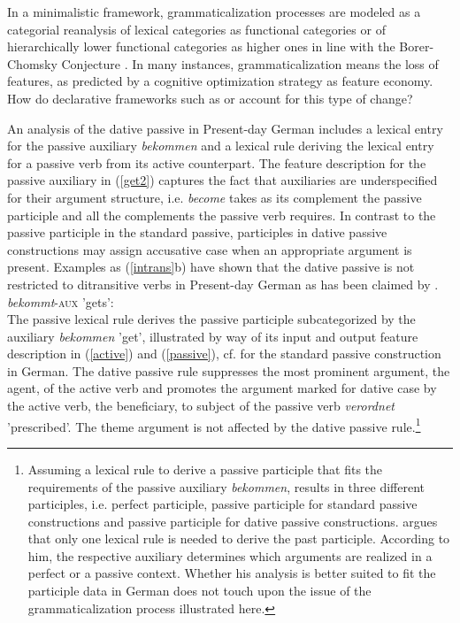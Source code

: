 \documentclass[output=paper]{langsci/langscibook}
\begin{document}
In a minimalistic framework, grammaticalization processes are modeled as a categorial reanalysis of lexical categories as functional categories or of hierarchically lower functional categories as higher ones in line with the Borer-Chomsky Conjecture \citep{RobRou2003}. In many instances, grammaticalization means the loss of features, as predicted by a cognitive optimization strategy as feature economy. How do declarative frameworks such as \lfg or \hpsg account for this type of change? 

An \hpsg analysis of the dative passive in Present-day German includes a lexical entry for the passive auxiliary \textit{bekommen} and a lexical rule deriving the lexical entry for a passive verb from its active counterpart. The feature description for the passive auxiliary in (\ref{get2}) captures the fact that auxiliaries are underspecified for their argument structure, i.e. \textit{become} takes as its complement the passive participle and all the complements the passive verb requires. In contrast to the passive participle in the standard passive, participles in dative passive constructions may assign accusative case when an appropriate argument is present. Examples as (\ref{intrans}b) have shown that the dative passive is not restricted to ditransitive verbs in Present-day German as has been claimed by \cite{KoNo2009}.
\ea \label{get2}
\textit{bekommt}-\textsc{aux} 'gets': \\
\z 
The passive lexical rule derives the passive participle subcategorized by the auxiliary \textit{bekommen} 'get', illustrated by way of its input and output feature description in (\ref{active}) and (\ref{passive}), cf. \cite[285]{mueller2018} for the standard passive construction in German. The dative passive rule suppresses the most prominent argument, the agent, of the active verb and promotes the argument marked for dative case by the active verb, the beneficiary, to subject of the passive verb \textit{verordnet} 'prescribed'. The theme argument is not affected by the dative passive rule.\footnote{Assuming a  lexical rule to derive a passive participle that fits the requirements of the passive auxiliary \textit{bekommen}, results in three different participles, i.e. perfect participle, passive participle for standard passive constructions and passive participle for dative passive constructions. \cite{mueller2018} argues that only one lexical rule is needed to derive the past participle. According to him, the respective auxiliary determines which arguments are realized in a perfect or a passive context. Whether his analysis is better suited to fit the participle data in German does not touch upon the issue of the grammaticalization process illustrated here.}
\end{document}
